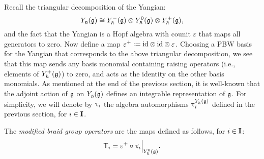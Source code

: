 Recall the triangular decomposition of the Yangian:
\[\Yhg \cong \Yhg[-]\otimes\Yhg[0]\otimes\Yhg[+],\]
and the fact that the Yangian is a Hopf algebra with counit $\varepsilon$ that maps all generators to zero.
Now define a map $\varepsilon^+:={\id}\otimes{\id}\otimes\varepsilon$.
Choosing a PBW basis for the Yangian that corresponds to the above triangular decomposition, we see that this map sends any basis monomial containing raising operators (i.e., elements of $\Yhg[+]$) to zero, and acts as the identity on the other basis monomials.
As mentioned at the end of the previous section, it is well-known that the adjoint action of $\g$ on $\Yhg$ defines an integrable representation of $\g$.
For simplicity, we will denote by $\braid_i$ the algebra automorphisms $\braid_i^{\Yhg}$ defined in the previous section, for $i\in\I$.

\begin{definition}\label{D:mbraid}
    The \emph{modified braid group operators} are the maps defined as follows, for $i\in\I$:
    \[\mbraid_i = \varepsilon^+ \circ \braid_i\Big|_{\Yhg[0]}.\]
\end{definition}

